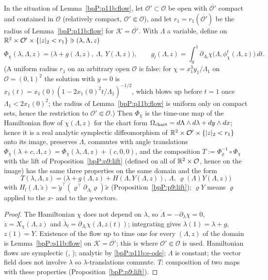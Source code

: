 \begin{proposition}\label{bpP:p11b:lift-map}
In the situation of Lemma~\ref{bpP:p11b:flow}, let $\mathcal O'\subset\mathcal O$ be open with $\overline{\mathcal O'}$ compact and contained in $\mathcal O$ (relatively compact, $\mathcal O'\Subset\mathcal O$), and let $r_1=r_1(\overline{\mathcal O'})$ be the radius of Lemma~\ref{bpP:p11b:flow} for $\mathcal K=\overline{\mathcal O'}$. With $\Lambda$ a variable, define on $\mathbb{R}^2\times\mathcal O'\times\{\lvert z\rvert_2<r_1\}\ni(\lambda,\Lambda,z)$
\[\Phi_\chi(\lambda,\Lambda,z)=\big(\lambda+g(\Lambda,z),\ \Lambda,\ Y(\Lambda,z)\big),\qquad g_l(\Lambda,z)=\int_0^1\partial_{\Lambda_l}\chi\big(\Lambda,\phi^t_\chi(\Lambda,z)\big)\,dt.\]
(A uniform radius $r_1$ on an arbitrary open $\mathcal O$ is false: for $\chi=x_1^3y_1/\Lambda_1$ on $\mathcal O=(0,1)^2$ the solution with $y=0$ is $x_1(t)=x_1(0)(1-2x_1(0)^2t/\Lambda_1)^{-1/2}$, which blows up before $t=1$ once $\Lambda_1<2x_1(0)^2$; the radius of Lemma~\ref{bpP:p11b:flow} is uniform only on compact sets, hence the restriction to $\mathcal O'\Subset\mathcal O$.) Then $\Phi_\chi$ is the time-one map of the Hamiltonian flow of $\chi(\Lambda,z)$ for the chart form $\Omega_{\rm chart}=d\Lambda\wedge d\lambda+dy\wedge dx$; hence it is a real analytic symplectic diffeomorphism of $\mathbb{R}^2\times\mathcal O'\times\{\lvert z\rvert_2<r_1\}$ onto its image, preserves $\Lambda$, commutes with angle translations $\Phi_\chi(\lambda+c,\Lambda,z)=\Phi_\chi(\lambda,\Lambda,z)+(c,0,0)$, and the composition $T:=\Phi_\varrho^{-1}\circ\Phi_\chi$ with the lift of Proposition~\ref{bpP:p9:lift} (defined on all of $\mathbb{R}^2\times\mathcal O$, hence on the image) has the same three properties on the same domain and the form
\[T(\lambda,\Lambda,z)=\big(\lambda+g(\Lambda,z)+H(\Lambda,Y(\Lambda,z)),\ \Lambda,\ \varrho(\Lambda)Y(\Lambda,z)\big)\]
with $H_l(\Lambda,\tilde z)=\tilde y^\top(\varrho^\top\partial_{\Lambda_l}\varrho)\tilde x$ (Proposition~\ref{bpP:p9:lift}); $\varrho Y$ means $\varrho$ applied to the $x$- and to the $y$-vectors.
\end{proposition}
\begin{proof}
\label{stepP:p11b:lm-ham} The Hamiltonian $\chi$ does not depend on $\lambda$, so $\dot\Lambda=-\partial_\lambda\chi=0$, $\dot z=X_\chi(\Lambda,z)$ and $\dot\lambda_l=\partial_{\Lambda_l}\chi(\Lambda,z(t))$; integrating gives $\lambda(1)=\lambda+g$, $z(1)=Y$.
\label{stepP:p11b:lm-prop} Existence of the flow up to time one for every $(\Lambda,z)$ of the domain is Lemma~\ref{bpP:p11b:flow} on $\mathcal K=\overline{\mathcal O'}$; this is where $\mathcal O'\Subset\mathcal O$ is used. Hamiltonian flows are symplectic (, ); analytic by \ref{bpP:p11b:e-ode}; $\Lambda$ is constant; the vector field does not involve $\lambda$ so $\lambda$-translations commute. $T$: composition of two maps with these properties (Proposition~\ref{bpP:p9:lift}).
\end{proof}

